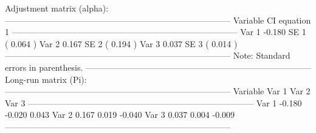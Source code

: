 \documentclass[article]{jss}
\begin{document}
\begin{CodeChunk}
\begin{CodeOutput}
    Adjustment matrix (alpha):                                                                         
--------------------------------------------------------------------------------
      Variable        CI equation 1  
--------------------------------------------------------------------------------
        Var 1            -0.180     
         SE 1         (   0.064  )  
        Var 2             0.167     
         SE 2         (   0.194  )  
        Var 3             0.037     
         SE 3         (   0.014  )  
--------------------------------------------------------------------------------
Note: Standard errors in parenthesis.                                                                
--------------------------------------------------------------------------------
    Long-run matrix (Pi):                                                                       
--------------------------------------------------------------------------------
      Variable         Var 1          Var 2          Var 3   
--------------------------------------------------------------------------------
      Var 1           -0.180         -0.020          0.043    
      Var 2            0.167          0.019         -0.040    
      Var 3            0.037          0.004         -0.009    
--------------------------------------------------------------------------------


\end{CodeOutput}
\end{CodeChunk}
\end{document}
